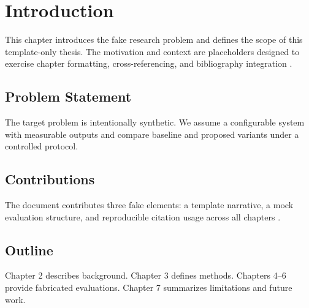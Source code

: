 \chapter{Introduction}
\label{chap:introduction}

This chapter introduces the fake research problem and defines the scope of this template-only thesis. The motivation and context are placeholders designed to exercise chapter formatting, cross-referencing, and bibliography integration \cite{smith2024adaptive}.

\section{Problem Statement}
The target problem is intentionally synthetic. We assume a configurable system with measurable outputs and compare baseline and proposed variants under a controlled protocol.

\section{Contributions}
The document contributes three fake elements: a template narrative, a mock evaluation structure, and reproducible citation usage across all chapters \cite{patel2022benchmarking}.

\section{Outline}
Chapter 2 describes background. Chapter 3 defines methods. Chapters 4--6 provide fabricated evaluations. Chapter 7 summarizes limitations and future work.
